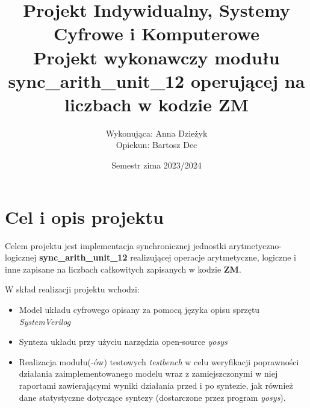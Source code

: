 \documentclass[12pt]{article}
\title{Projekt Indywidualny, Systemy Cyfrowe i Komputerowe
\\

\large Projekt wykonawczy modułu \textbf{sync\_arith\_unit\_12} 
operującej na liczbach w kodzie \textbf{ZM} }
\author{
  \begin{tabular}{c}
    Wykonująca: Anna Dzieżyk \\
    Opiekun: Bartosz Dec
  \end{tabular}
}
\date{Semestr zima 2023/2024}
\begin{document}
\maketitle

\tableofcontents

\section{Cel i opis projektu}

Celem projektu jest implementacja synchronicznej
jednostki arytmetyczno-logicznej 
\textbf{sync\_arith\_unit\_12} 
realizującej operacje arytmetyczne, logiczne i inne zapisane na liczbach całkowitych zapisanych w kodzie 
\textbf{ZM}.

\setlength{\indent}{}

W skład realizacji projektu wchodzi:

\begin{itemize}
  \item Model układu cyfrowego opisany za pomocą języka opisu sprzętu 
  \textit{SystemVerilog}
  \item Synteza układu przy użyciu narzędzia open-source 
  \textit{yosys}
  \item Realizacja modułu(-ów) testowych 
  \textit{testbench} w celu weryfikacji poprawności działania zaimplementowanego modelu wraz z zamiejszczonymi 
  w niej raportami zawierającymi wyniki działania przed i po syntezie, jak również dane statystyczne
  dotyczące syntezy (dostarczone przez program 
  \textit{yosys}).
\end{itemize}
\end{document}
